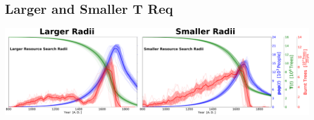 \subsection{Larger and Smaller T Req}

\begin{frame}
	\centering
	\includegraphics[width=\linewidth]{../../Thesis/images/Results/EnsembleStatistics_largersmallerRad}
\end{frame}





